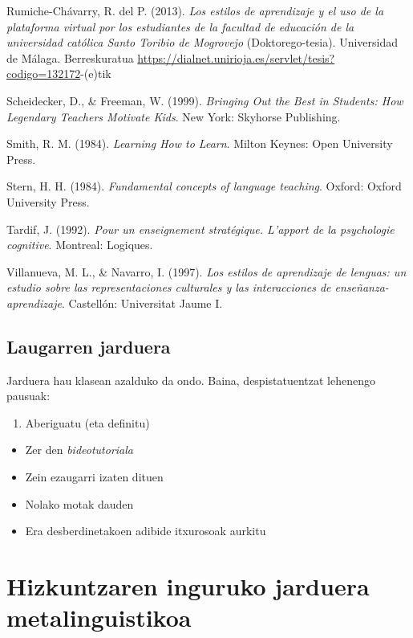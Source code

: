 \documentclass[
]{book}
\providecommand{\tightlist}{%
  \setlength{\itemsep}{0pt}\setlength{\parskip}{0pt}}
\begin{document}
Rumiche-Chávarry, R. del P. (2013). \emph{Los estilos de aprendizaje y el uso de la plataforma virtual por los estudiantes de la facultad de educación de la universidad católica Santo Toribio de Mogrovejo} (Doktorego-tesia). Universidad de Málaga. Berreskuratua \url{https://dialnet.unirioja.es/servlet/tesis?codigo=132172}-(e)tik

Scheidecker, D., \& Freeman, W. (1999). \emph{Bringing Out the Best in Students: How Legendary Teachers Motivate Kids}. New York: Skyhorse Publishing.

Smith, R. M. (1984). \emph{Learning How to Learn}. Milton Keynes: Open University Press.

Stern, H. H. (1984). \emph{Fundamental concepts of language teaching}. Oxford: Oxford University Press.

Tardif, J. (1992). \emph{Pour un enseignement stratégique. L'apport de la psychologie cognitive}. Montreal: Logiques.

Villanueva, M. L., \& Navarro, I. (1997). \emph{Los estilos de aprendizaje de lenguas: un estudio sobre las representaciones culturales y las interacciones de enseñanza-aprendizaje}. Castellón: Universitat Jaume I.

\hypertarget{laugarren-jarduera}{%
\section*{Laugarren jarduera}\label{laugarren-jarduera}}

Jarduera hau klasean azalduko da ondo. Baina, despistatuentzat lehenengo pausuak:

\begin{enumerate}
\def\labelenumi{\arabic{enumi}.}
\tightlist
\item
  Aberiguatu (eta definitu)
\end{enumerate}

\begin{itemize}
\tightlist
\item
  Zer den \emph{bideotutoriala}
\item
  Zein ezaugarri izaten dituen
\item
  Nolako motak dauden
\item
  Era desberdinetakoen adibide itxurosoak aurkitu
\end{itemize}

\hypertarget{hizkuntzaren-inguruko-jarduera-metalinguistikoa}{%
\chapter{Hizkuntzaren inguruko jarduera metalinguistikoa}\label{hizkuntzaren-inguruko-jarduera-metalinguistikoa}}
\end{document}
